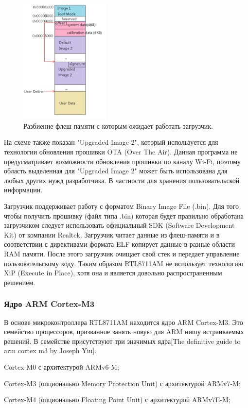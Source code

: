 \begin{figure}[h!]
    \centering
    \includegraphics[width=0.4\textwidth]{rtl8711am_flash_layout.png}
    \caption{Разбиение флеш-памяти с которым ожидает работать загрузчик.}
\end{figure}

На схеме также показан "Upgraded Image 2", который используется для технологии обновления прошивки OTA (Over The Air). Данная программа не предусматривает возможности обновления прошивки по каналу Wi-Fi, поэтому область выделенная для "Upgraded Image 2" может быть использована для любых других нужд разработчика. В частности для хранения пользовательской информации.


Загрузчик поддерживает работу с форматом Binary Image File (.bin). Для того чтобы получить прошивку (файл типа .bin) которая будет правильно обработана загрузчиком следует использовать официальный SDK (Software Development Kit) от компании Realtek. Загрузчик читает данные из флеш-памяти и в соответствии с директивами формата ELF копирует данные в разные области RAM памяти. После этого загрузчик очищает свой стек и передает управление пользовательскому коду. Таким образом RTL8711AM не использует технологию XiP (Execute in Place), хотя она и является довольно распространенным решением.

\subsubsection{ Ядро ARM Cortex-M3}
В основе микроконтроллера RTL8711AM находится ядро ARM Cortex-M3. Это семейство процессоров, призванное занять новую для ARM нишу встраиваемых решений. В семействе присутствуют три значимых ядра[The definitive guide to arm cortex m3 by Joseph Yiu].

\begin{my_enumerate}
\item Cortex-M0 с архитектурой ARMv6-M;
\item Cortex-M3 (опционально Memory Protection Unit) с архитектурой ARMv7-M;
\item Cortex-M4 (опционально Floating Point Unit) с архитектурой ARMv7E-M;
\end{my_enumerate}

